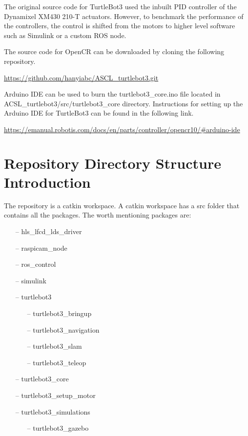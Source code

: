 \documentclass[12]{article}
\begin{document}
The original source code for TurtleBot3 used the inbuilt PID controller of the Dynamixel XM430 210-T actuators. However, to benchmark the performance of the controllers, the control is shifted from the motors to higher level software such as Simulink or a custom ROS node.

The source code for OpenCR can be downloaded by cloning the following repository.

\url {https://github.com/hanyiabc/ASCL_turtlebot3.git}

Arduino IDE can be used to burn the turtlebot3\_core.ino file located in ACSL\_turtlebot3/src/turtlebot3\_core directory. Instructions for setting up the Arduino IDE for TurtleBot3 can be found in the following link.

\url {https://emanual.robotis.com/docs/en/parts/controller/opencr10/#arduino-ide}

\newpage
\section{Repository Directory Structure Introduction}
The repository is a catkin workspace. A catkin workspace has a src folder that contains all the packages. The worth mentioning packages are:
\begin{itemize}
	\item[--] hls\_lfcd\_lds\_driver
    \item[--] raspicam\_node
    \item[--] ros\_control
    \item[--] simulink
    \item[--] turtlebot3
    \begin{itemize}
        \item[--] turtlebot3\_bringup
        \item[--] turtlebot3\_navigation
        \item[--] turtlebot3\_slam
        \item[--] turtlebot3\_teleop
    \end {itemize}
    \item[--] turtlebot3\_core
    \item[--] turtlebot3\_setup\_motor
    \item[--] turtlebot3\_simulations
    \begin{itemize}
        \item[--] turtlebot3\_gazebo
    \end{itemize}
\end{itemize} 
\end{document}
